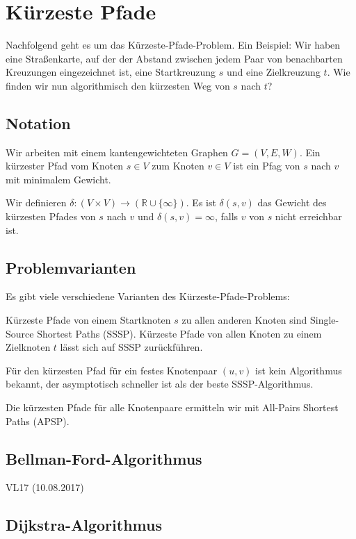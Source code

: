 \documentclass[12pt]{article}
\begin{document}
\section{Kürzeste Pfade}

Nachfolgend geht es um das Kürzeste-Pfade-Problem. Ein Beispiel: Wir haben eine Straßenkarte, auf der der Abstand zwischen jedem Paar von benachbarten Kreuzungen eingezeichnet ist, eine Startkreuzung $s$ und eine Zielkreuzung $t$. Wie finden wir nun algorithmisch den kürzesten Weg von $s$ nach $t$?

\subsection{Notation}

Wir arbeiten mit einem kantengewichteten Graphen $G = (V, E, W)$. Ein kürzester Pfad vom Knoten $s \in V$ zum Knoten $v \in V$ ist ein Pfag von $s$ nach $v$ mit minimalem Gewicht.

Wir definieren $\delta: (V \times V) \rightarrow (\mathbb{R} \cup \{\infty\})$. Es ist $\delta(s, v)$ das Gewicht des kürzesten Pfades von $s$ nach $v$ und $\delta(s, v) = \infty$, falls $v$ von $s$ nicht erreichbar ist.

\subsection{Problemvarianten}

Es gibt viele verschiedene Varianten des Kürzeste-Pfade-Problems:

Kürzeste Pfade von einem Startknoten $s$ zu allen anderen Knoten sind Single-Source Shortest Paths (SSSP). Kürzeste Pfade von allen Knoten zu einem Zielknoten $t$ lässt sich auf SSSP zurückführen.

Für den kürzesten Pfad für ein festes Knotenpaar $(u, v)$ ist kein Algorithmus bekannt, der asymptotisch schneller ist als der beste SSSP-Algorithmus.

Die kürzesten Pfade für alle Knotenpaare ermitteln wir mit All-Pairs Shortest Paths (APSP).

\subsection{Bellman-Ford-Algorithmus}

VL17 (10.08.2017)

\subsection{Dijkstra-Algorithmus}
\end{document}

